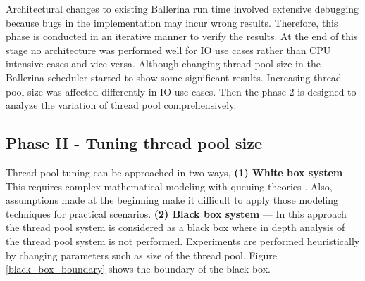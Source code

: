 Architectural changes to existing Ballerina run time involved extensive debugging because bugs in the implementation may incur wrong results. Therefore, this phase is conducted in an iterative manner to verify the results.
At the end of this stage no architecture was performed well for IO use cases rather than CPU intensive cases and vice versa. Although changing thread pool size in the Ballerina scheduler started to show some significant results. Increasing thread pool size was affected differently in IO use cases. Then the phase 2 is designed to analyze the variation of thread pool comprehensively.


\subsection{Phase II - Tuning thread pool size}

Thread pool tuning can be approached in two ways, \textbf{(1) White box system} — This requires complex mathematical modeling with queuing theories \cite{math_aproach_thread_pool_tuning}. Also, assumptions made at the beginning make it difficult to apply those modeling techniques for practical scenarios. \textbf{(2) Black box system} — In this approach the thread pool system is considered as a black box where in depth analysis of the thread pool system is not performed. Experiments are performed heuristically by changing parameters such as size of the thread pool. Figure \ref{black_box_boundary} shows the boundary of the black box.

